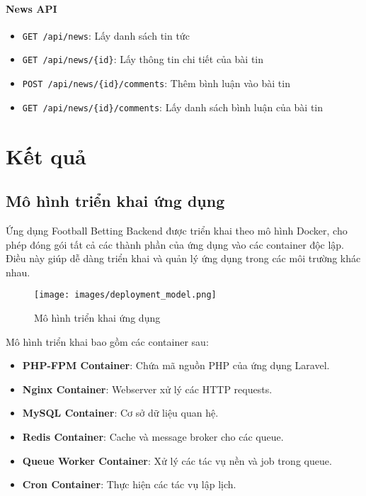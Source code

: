 \documentclass[a4paper,12pt]{report}
\begin{document}
\subsubsection{News API}
\begin{itemize}
    \item \texttt{GET /api/news}: Lấy danh sách tin tức
    \item \texttt{GET /api/news/\{id\}}: Lấy thông tin chi tiết của bài tin
    \item \texttt{POST /api/news/\{id\}/comments}: Thêm bình luận vào bài tin
    \item \texttt{GET /api/news/\{id\}/comments}: Lấy danh sách bình luận của bài tin
\end{itemize}

\chapter{Kết quả}

\section{Mô hình triển khai ứng dụng}

Ứng dụng Football Betting Backend được triển khai theo mô hình Docker, cho phép đóng gói tất cả các thành phần của ứng dụng vào các container độc lập. Điều này giúp dễ dàng triển khai và quản lý ứng dụng trong các môi trường khác nhau.

\begin{figure}[H]
\centering
\texttt{[image: images/deployment\_model.png]}
\caption{Mô hình triển khai ứng dụng}
\label{fig:deployment-model}
\end{figure}

Mô hình triển khai bao gồm các container sau:
\begin{itemize}
    \item \textbf{PHP-FPM Container}: Chứa mã nguồn PHP của ứng dụng Laravel.
    \item \textbf{Nginx Container}: Webserver xử lý các HTTP requests.
    \item \textbf{MySQL Container}: Cơ sở dữ liệu quan hệ.
    \item \textbf{Redis Container}: Cache và message broker cho các queue.
    \item \textbf{Queue Worker Container}: Xử lý các tác vụ nền và job trong queue.
    \item \textbf{Cron Container}: Thực hiện các tác vụ lập lịch.
\end{itemize}
\end{document}
